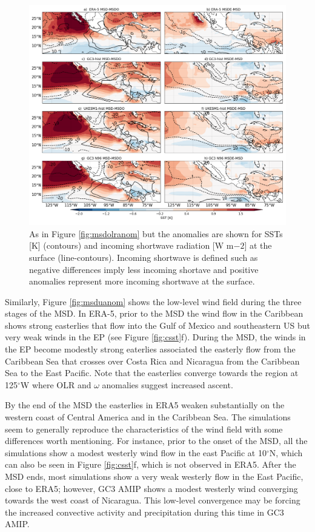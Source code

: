  \begin{figure}[t!]
\includegraphics[width=\linewidth]{figures/fig4_sstdiff}
\caption{As in Figure \ref{fig:msdolranom} but the anomalies are shown for SSTs [K] (contours) and incoming shortwave radiation [W m${-2}$] at the surface (line-contours). Incoming shortwave is defined such as negative differences imply less incoming shortave and positive anomalies represent more incoming shortwave at the surface. }
\label{fig:msdsstanom}
\end{figure}

Similarly, Figure \ref{fig:msduanom} shows the low-level wind field during the three stages of the MSD. In ERA-5, prior to the MSD the wind flow in the Caribbean shows strong easterlies that flow into the Gulf of Mexico and southeastern US but very weak winds in the EP (see Figure \ref{fig:csst}f). During the MSD, the winds in the EP become modestly strong eaterlies associated the easterly flow from the Caribbean Sea that crosses over Costa Rica and Nicaragua from the Caribbean Sea to the East Pacific. Note that the easterlies converge towards the region at 125$^\circ$W where OLR and $\omega$ anomalies suggest increased ascent. 

By the end of the MSD the easterlies in ERA5 weaken substantially on the western coast of Central America and in the Caribbean Sea.
The simulations seem to generally reproduce the characteristics of the wind field with some differences worth mentioning. For instance, prior to the onset of the MSD, all the simulations show a modest westerly wind flow in the east Pacific at 10$^\circ$N, which can also be seen in Figure \ref{fig:csst}f, which is not observed in ERA5.
After the MSD ends, most simulations show a very weak westerly flow in the East Pacific, close to ERA5; however, GC3 AMIP shows a modest westerly wind converging towards the west coast of Nicaragua. This low-level convergence may be forcing the increased convective activity and precipitation during this time in GC3 AMIP.

